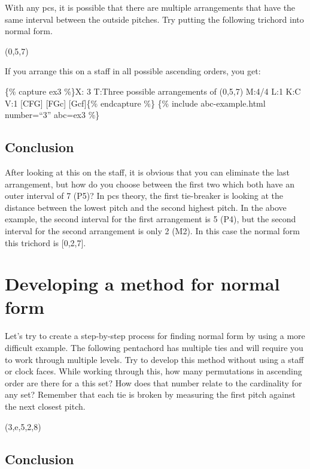 \documentclass{book}
\begin{document}
With any pcs, it is possible that there are multiple arrangements that have
the same interval between the outside pitches. Try putting the following
trichord into normal form.

(0,5,7)

If you arrange this on a staff in all possible ascending orders, you get:

\{\% capture ex3 \%\}X: 3 T:Three possible arrangements of (0,5,7) M:4/4 L:1
K:C V:1 {[}CFG{]}\textbar{} {[}FGc{]}\textbar{} {[}Gcf{]}\textbar{]}\{\%
endcapture \%\} \{\% include abc-example.html number=``3'' abc=ex3 \%\}

\hypertarget{conclusion-3}{%
\subsection{Conclusion}\label{conclusion-3}}

After looking at this on the staff, it is obvious that you can eliminate the
last arrangement, but how do you choose between the first two which both have
an outer interval of 7 (P5)? In pcs theory, the first tie-breaker is looking
at the distance between the lowest pitch and the second highest pitch. In the
above example, the second interval for the first arrangement is 5 (P4), but
the second interval for the second arrangement is only 2 (M2). In this case
the normal form this trichord is {[}0,2,7{]}.

\hypertarget{developing-a-method-for-normal-form}{%
\section{Developing a method for normal
form}\label{developing-a-method-for-normal-form}}

Let's try to create a step-by-step process for finding normal form by using a
more difficult example. The following pentachord has multiple ties and will
require you to work through multiple levels. Try to develop this method
without using a staff or clock faces. While working through this, how many
permutations in ascending order are there for a this set? How does that number
relate to the cardinality for any set? Remember that each tie is broken by
measuring the first pitch against the next closest pitch.

(3,e,5,2,8)

\hypertarget{conclusion-4}{%
\subsection{Conclusion}\label{conclusion-4}}
\end{document}
